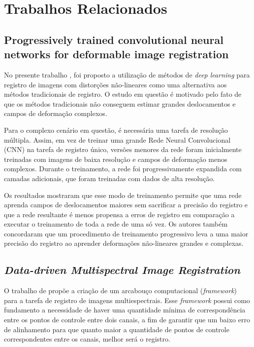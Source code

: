 \documentclass[12pt]{article}
\begin{document}
\section{Trabalhos Relacionados}
\label{sec:trab_relacionados}

\subsection{Progressively trained  convolutional  neural  networks  for  deformable  image  registration}

No presente trabalho \cite{eppenhof2019progressively}, foi proposto a utilização de métodos de \textit{deep learning} para registro de imagens com distorções não-lineares como uma alternativa aos métodos tradicionais de registro. O estudo em questão é motivado pelo fato de que os métodos tradicionais não conseguem estimar grandes deslocamentos e campos de deformação complexos. 

Para o complexo cenário em questão, é necessária uma tarefa de resolução múltipla. Assim, em vez de treinar uma grande Rede Neural Convolucional (CNN) na tarefa de registro único, versões menores da rede foram inicialmente treinadas com imagens de baixa resolução e campos de deformação menos complexos. Durante o treinamento, a rede foi progressivamente expandida com camadas adicionais, que foram treinadas com dados de alta resolução. 

Os resultados mostraram que esse modo de treinamento permite que uma rede aprenda campos de deslocamentos maiores sem sacrificar a precisão do registro e que a rede resultante é menos propensa a erros de registro em comparação a executar o treinamento de toda a rede de uma só vez. Os autores também concordaram que um procedimento de treinamento progressivo leva a uma maior precisão do registro ao aprender deformações não-lineares grandes e complexas.

\subsection{\textit{Data-driven Multispectral Image Registration}}

O trabalho de \cite{yasir2018data} propõe a criação de um arcabouço computacional (\textit{framework}) para a tarefa de registro de imagens multiespectrais. Esse \textit{framework} possui como fundamento a necessidade de haver uma quantidade mínima de correspondência entre os pontos de controle entre dois canais, a fim de garantir que um baixo erro de alinhamento para que quanto maior a quantidade de pontos de controle correspondentes entre os canais, melhor será o registro.
\end{document}
